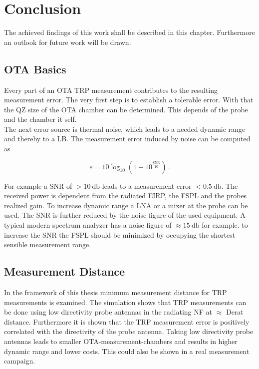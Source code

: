 \chapter{Conclusion}

The achieved findings of this work shall be described in this chapter. Furthermore an outlook for future work will be drawn.

\section{OTA Basics}

Every part of an \acf{OTA} \acf{TRP} measurement contributes to the resulting measurement error. The very first step is to establish a tolerable error. With that the \acf{QZ} size of the \ac{OTA} chamber can be determined. This depends of the probe and the chamber it self.\\
The next error source is thermal noise, which leads to a needed dynamic range and thereby to a \acf{LB}. The measurement error induced by noise can be computed as 

\begin{equation}
e = 10\log_{10}\left(1+10^{\frac{\text{SNR}}{10}}\right)\,.
\end{equation}

For example a \acf{SNR} of $>\SI{10}{\decibel}$ leads to a measurement error $<\SI{0.5}{\decibel}$. The received power is dependent from the radiated \ac{EIRP}, the \acf{FSPL} and the probes realized gain. To increase dynamic range a \acf{LNA} or a mixer at the probe can be used. The \ac{SNR} is further reduced by the noise figure of the used equipment. A typical modern spectrum analyzer has a noise figure of $\approx\SI{15}{\decibel}$ for example. to increase the \ac{SNR} the \ac{FSPL} should be minimized by occupying the shortest sensible measurement range.

\section{Measurement Distance}

In the framework of this thesis minimum measurement distance for \acf{TRP} measurements is examined. The simulation shows that \ac{TRP} measurements can be done using low directivity probe antennas in the radiating \acf{NF} at $\approx$ Derat distance. Furthermore it is shown that the \ac{TRP} measurement error is positively correlated with the directivity of the probe antenna. Taking low directivity probe antennas leads to smaller \ac{OTA}-measurement-chambers and results in higher dynamic range and lower costs. This could also be shown in a real measurement campaign.

